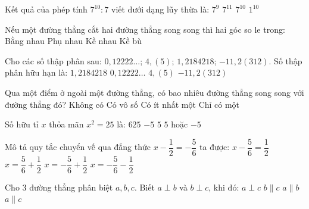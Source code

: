 \documentclass[12pt,a4paper]{article}
\begin{document}
\begin{ex}
Kết quả của phép tính $7^{10} : 7$ viết dưới dạng lũy thừa là:
\choice
{\True $7^9$}
{$7^{11}$}
{$7^{10}$}
{$1^{10}$}
\end{ex}

\begin{ex}
Nếu một đường thẳng cắt hai đường thẳng song song thì hai góc so le trong:
\choice
{\True Bằng nhau}
{Phụ nhau}
{Kề nhau}
{Kề bù}
\end{ex}

\begin{ex}
Cho các số thập phân sau: $0{,}12222\dots$; $4{,}(5)$; $1{,}2184218$; $-11{,}2(312)$. Số thập phân hữu hạn là:
\choice
{\True $1{,}2184218$}
{$0{,}12222\dots$}
{$4{,}(5)$}
{$-11{,}2(312)$}
\end{ex}

\begin{ex}
Qua một điểm ở ngoài một đường thẳng, có bao nhiêu đường thẳng song song với đường thẳng đó?
\choice
{Không có}
{Có vô số}
{Có ít nhất một}
{\True Chỉ có một}
\end{ex}

\begin{ex}
Số hữu tỉ $x$ thỏa mãn $x^2 = 25$ là:
\choice
{$625$}
{$-5$}
{$5$}
{\True $5$ hoặc $-5$}
\end{ex}

\begin{ex}
Mô tả quy tắc chuyển vế qua đẳng thức $x - \dfrac{1}{2} = -\dfrac{5}{6}$ ta được:
\choice
{$x - \dfrac{5}{6} = \dfrac{1}{2}$}
{$x = \dfrac{5}{6} + \dfrac{1}{2}$}
{\True $x = -\dfrac{5}{6} + \dfrac{1}{2}$}
{$x = -\dfrac{5}{6} - \dfrac{1}{2}$}
\end{ex}

\begin{ex}
Cho 3 đường thẳng phân biệt $a, b, c$. Biết $a \perp b$ và $b \perp c$, khi đó:
\choice
{$a \perp c$}
{$b \parallel c$}
{$a \parallel b$}
{\True $a \parallel c$}
\end{ex}
\end{document}
